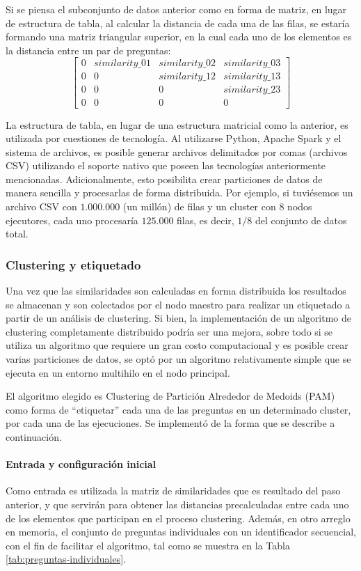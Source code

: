 \bigskip Si se piensa el subconjunto de datos anterior como en forma de matriz, en lugar de estructura de tabla, al calcular la distancia de cada una de las filas, se estaría formando una matriz triangular superior, en la cual cada uno de los elementos es la distancia entre un par de preguntas:
\[\begin{bmatrix}0 & similarity\_01 & similarity\_02 & similarity\_03 \\ 0 & 0 & similarity\_12 & similarity\_13  \\ 0 & 0  & 0 & similarity\_23  \\ 0 & 0 & 0 & 0 \end{bmatrix}\]

\bigskip La estructura de tabla, en lugar de una estructura matricial como la anterior, es utilizada por cuestiones de tecnología. Al utilizarse Python, Apache Spark y el sistema de archivos, es posible generar archivos delimitados por comas (archivos CSV) utilizando el soporte nativo que poseen las tecnologías anteriormente mencionadas. Adicionalmente, esto posibilita crear particiones de datos de manera sencilla y procesarlas de forma distribuida. Por ejemplo, si tuviésemos un archivo CSV con \(1.000.000\) (un millón) de filas y un cluster con \(8\) nodos ejecutores, cada uno procesaría \(125.000\) filas, es decir, \(1/8\) del conjunto de datos total.

\subsubsection{Clustering y etiquetado}
Una vez que las similaridades son calculadas en forma distribuida los resultados se almacenan y son colectados por el nodo maestro para realizar un etiquetado a partir de un análisis de clustering. Si bien, la implementación de un algoritmo de clustering completamente distribuido podría ser una mejora, sobre todo si se utiliza un algoritmo que requiere un gran costo computacional y es posible crear varias particiones de datos, se optó por un algoritmo relativamente simple que se ejecuta en un entorno multihilo en el nodo principal.

\bigskip El algoritmo elegido es Clustering de Partición Alrededor de Medoids (PAM) como forma de “etiquetar” cada una de las preguntas en un determinado cluster, por cada una de las ejecuciones. Se implementó de la forma que se describe a continuación.

\paragraph{Entrada y configuración inicial}
Como entrada es utilizada la matriz de similaridades que es resultado del paso anterior, y que servirán para obtener las distancias precalculadas entre cada uno de los elementos que participan en el proceso clustering. Además, en otro arreglo en memoria, el conjunto de preguntas individuales con un identificador secuencial, con el fin de facilitar el algoritmo, tal como se muestra en la Tabla \ref{tab:preguntas-individuales}.

